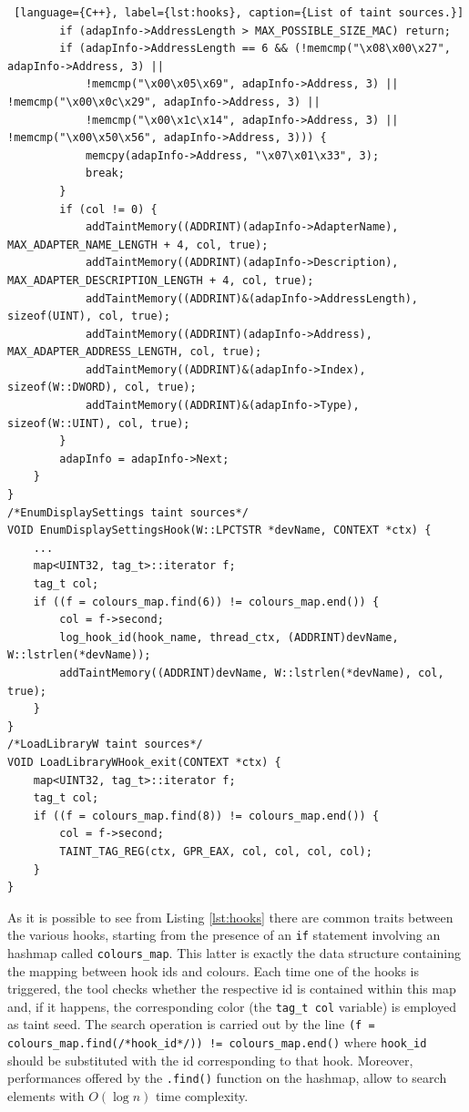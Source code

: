 \documentclass[LaM,binding=0.6cm]{sapthesis}
\begin{document}
\begin{lstlisting} [language={C++}, label={lst:hooks}, caption={List of taint sources.}]
		if (adapInfo->AddressLength > MAX_POSSIBLE_SIZE_MAC) return;
		if (adapInfo->AddressLength == 6 && (!memcmp("\x08\x00\x27", adapInfo->Address, 3) ||
			!memcmp("\x00\x05\x69", adapInfo->Address, 3) || !memcmp("\x00\x0c\x29", adapInfo->Address, 3) ||
			!memcmp("\x00\x1c\x14", adapInfo->Address, 3) || !memcmp("\x00\x50\x56", adapInfo->Address, 3))) {
			memcpy(adapInfo->Address, "\x07\x01\x33", 3);
			break;
		}
		if (col != 0) {
			addTaintMemory((ADDRINT)(adapInfo->AdapterName), MAX_ADAPTER_NAME_LENGTH + 4, col, true);
			addTaintMemory((ADDRINT)(adapInfo->Description), MAX_ADAPTER_DESCRIPTION_LENGTH + 4, col, true);
			addTaintMemory((ADDRINT)&(adapInfo->AddressLength), sizeof(UINT), col, true);
			addTaintMemory((ADDRINT)(adapInfo->Address), MAX_ADAPTER_ADDRESS_LENGTH, col, true);
			addTaintMemory((ADDRINT)&(adapInfo->Index), sizeof(W::DWORD), col, true);
			addTaintMemory((ADDRINT)&(adapInfo->Type), sizeof(W::UINT), col, true);
		}
		adapInfo = adapInfo->Next;
	}
}
/*EnumDisplaySettings taint sources*/
VOID EnumDisplaySettingsHook(W::LPCTSTR *devName, CONTEXT *ctx) {
	...
	map<UINT32, tag_t>::iterator f;
	tag_t col;
	if ((f = colours_map.find(6)) != colours_map.end()) {
		col = f->second;
		log_hook_id(hook_name, thread_ctx, (ADDRINT)devName, W::lstrlen(*devName));
		addTaintMemory((ADDRINT)devName, W::lstrlen(*devName), col, true);
	}
}
/*LoadLibraryW taint sources*/
VOID LoadLibraryWHook_exit(CONTEXT *ctx) {
	map<UINT32, tag_t>::iterator f;
	tag_t col;
	if ((f = colours_map.find(8)) != colours_map.end()) {
		col = f->second;
		TAINT_TAG_REG(ctx, GPR_EAX, col, col, col, col);
	}
}
\end{lstlisting}
As it is possible to see from Listing \ref{lst:hooks} there are common traits between the various hooks, starting from the presence of an \texttt{if} statement involving an hashmap called \texttt{colours\_map}. This latter is exactly the data structure containing the mapping between hook ids and colours. Each time one of the hooks is triggered, the tool checks whether the respective id is contained within this map and, if it happens, the corresponding color (the \texttt{tag\_t col} variable) is employed as taint seed. The search operation is carried out by the line \texttt{(f = colours\_map.find(/*hook\_id*/)) != colours\_map.end()} where \texttt{hook\_id} should be substituted with the id corresponding to that hook. Moreover, performances offered by the \texttt{.find()} function on the hashmap, allow to search elements with $O(\log n)$ time complexity.
\end{document}
